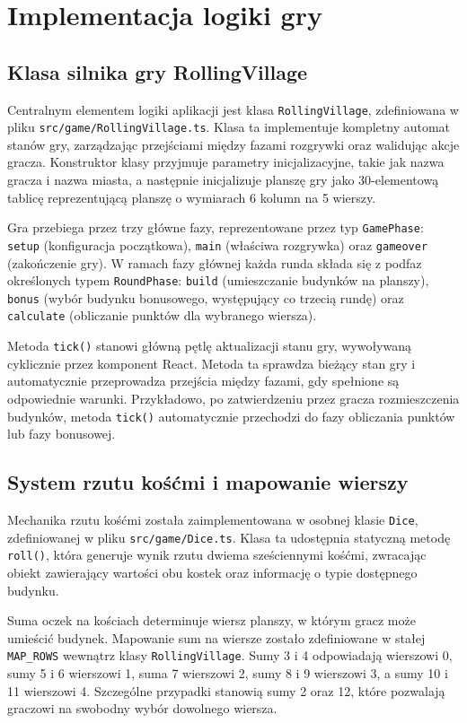 \documentclass[12pt, a4paper]{article}
\begin{document}
\section{Implementacja logiki gry}

\subsection{Klasa silnika gry RollingVillage}

Centralnym elementem logiki aplikacji jest klasa \texttt{RollingVillage}, zdefiniowana w pliku \texttt{src/game/RollingVillage.ts}. Klasa ta implementuje kompletny automat stanów gry, zarządzając przejściami między fazami rozgrywki oraz walidując akcje gracza. Konstruktor klasy przyjmuje parametry inicjalizacyjne, takie jak nazwa gracza i nazwa miasta, a następnie inicjalizuje planszę gry jako 30-elementową tablicę reprezentującą planszę o wymiarach 6 kolumn na 5 wierszy.

Gra przebiega przez trzy główne fazy, reprezentowane przez typ \texttt{GamePhase}: \texttt{setup} (konfiguracja początkowa), \texttt{main} (właściwa rozgrywka) oraz \texttt{gameover} (zakończenie gry). W ramach fazy głównej każda runda składa się z podfaz określonych typem \texttt{RoundPhase}: \texttt{build} (umieszczanie budynków na planszy), \texttt{bonus} (wybór budynku bonusowego, występujący co trzecią rundę) oraz \texttt{calculate} (obliczanie punktów dla wybranego wiersza).

Metoda \texttt{tick()} stanowi główną pętlę aktualizacji stanu gry, wywoływaną cyklicznie przez komponent React. Metoda ta sprawdza bieżący stan gry i automatycznie przeprowadza przejścia między fazami, gdy spełnione są odpowiednie warunki. Przykładowo, po zatwierdzeniu przez gracza rozmieszczenia budynków, metoda \texttt{tick()} automatycznie przechodzi do fazy obliczania punktów lub fazy bonusowej.

\subsection{System rzutu kośćmi i mapowanie wierszy}

Mechanika rzutu kośćmi została zaimplementowana w osobnej klasie \texttt{Dice}, zdefiniowanej w pliku \texttt{src/game/Dice.ts}. Klasa ta udostępnia statyczną metodę \texttt{roll()}, która generuje wynik rzutu dwiema sześciennymi kośćmi, zwracając obiekt zawierający wartości obu kostek oraz informację o typie dostępnego budynku.

Suma oczek na kościach determinuje wiersz planszy, w którym gracz może umieścić budynek. Mapowanie sum na wiersze zostało zdefiniowane w stałej \texttt{MAP\_ROWS} wewnątrz klasy \texttt{RollingVillage}. Sumy 3 i 4 odpowiadają wierszowi 0, sumy 5 i 6 wierszowi 1, suma 7 wierszowi 2, sumy 8 i 9 wierszowi 3, a sumy 10 i 11 wierszowi 4. Szczególne przypadki stanowią sumy 2 oraz 12, które pozwalają graczowi na swobodny wybór dowolnego wiersza.
\end{document}
